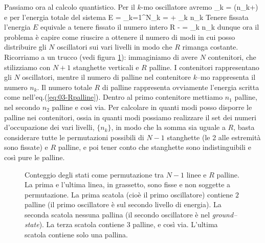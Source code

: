 Passiamo ora al calcolo quantistico. Per il $k$-mo oscillatore avremo
\be
\epsilon_k = \left(n_k+\right)\hbar\omega
\ee
e per l'energia totale del sistema
\be
E = \sum_{k=1}^N\epsilon_k =  + \hbar\omega\sum_k n_k
\ee
Tenere fissata l'energia $E$ equivale a tenere fissato il numero intero
\be
\label{eq:03-Rpalline}
R \equiv {} -  = \sum_k n_k
\ee
dunque ora il problema è capire come riuscire a ottenere il numero di modi in cui posso distribuire gli $N$ oscillatori sui vari livelli in modo che $R$ rimanga costante. Ricorriamo a un trucco (vedi figura \ref{fig:03-scapal}): immaginiamo di avere $N$ contenitori, che stilizziamo con $N+1$ stanghette verticali e $R$ palline. I contenitori rappresentano gli $N$ oscillatori, mentre il numero di palline nel contenitore $k$--mo rappresenta il numero $n_k$. Il numero totale $R$ di palline rappresenta ovviamente l'energia scritta come nell'eq.(\ref{eq:03-Rpalline}). Dentro al primo contenitore mettiamo $n_1$ palline, nel secondo $n_2$ palline e così via. Per calcolare in quanti modi posso disporre le palline nei contenitori, ossia in quanti modi possiamo realizzare il set dei numeri d'occupazione dei vari livelli, $\{n_k\}$, in modo che la somma sia uguale a $R$, basta considerare tutte le permutazioni possibili di $N-1$ stanghette (le 2 alle estremità sono fissate) e $R$ palline, e poi tener conto che stanghette sono indistinguibili e così pure le palline. 
\begin{figure}[!ht]
  \centering
  
  \caption{Conteggio degli stati come permutazione tra $N-1$ linee e $R$ palline. La prima e l'ultima linea, in grassetto, sono fisse e non soggette a permutazione. La prima scatola (cioè il primo oscillatore) contiene $2$ palline (il primo oscillatore è sul secondo livello di energia). La seconda scatola nessuna pallina (il secondo oscillatore è nel {\em ground--state}). La terza scatola contiene $3$ palline, e così via. L'ultima scatola contiene solo una pallina.}
  \label{fig:03-scapal}
\end{figure}

